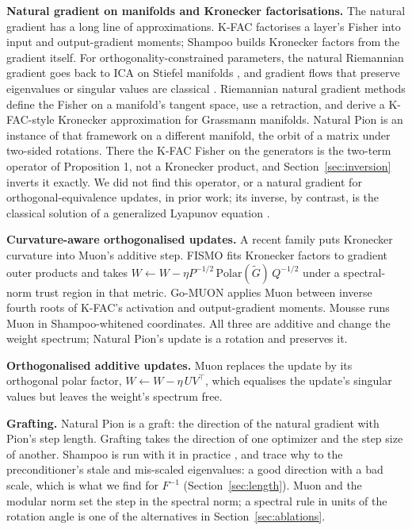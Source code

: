 \documentclass{article}
\begin{document}
\textbf{Natural gradient on manifolds and Kronecker factorisations.} The natural gradient \citep{amari1998natural}
has a long line of approximations. K-FAC \citep{martens2015kfac} factorises a layer's Fisher into input and
output-gradient moments; Shampoo \citep{gupta2018shampoo} builds Kronecker factors from the gradient itself. For
orthogonality-constrained parameters, the natural Riemannian gradient goes back to ICA on Stiefel manifolds
\citep{amari1999ica}, and gradient flows that preserve eigenvalues or singular values are classical
\citep[][Ch.~2--3]{helmke1994optimization}. Riemannian natural gradient methods \citep{hu2024riemannian} define the Fisher
on a manifold's tangent space, use a retraction, and derive a K-FAC-style Kronecker approximation for Grassmann
manifolds. Natural Pion is an instance of that framework on a different manifold, the orbit of a matrix under two-sided
rotations. There the K-FAC Fisher on the generators is the two-term operator of Proposition 1, not a Kronecker product,
and Section~\ref{sec:inversion} inverts it exactly. We did not find this operator, or a natural gradient for
orthogonal-equivalence updates, in prior work; its inverse, by contrast, is the classical solution of a generalized
Lyapunov equation \citep{simoncini2016computational}.

\textbf{Curvature-aware orthogonalised updates.} A recent family puts Kronecker curvature into Muon's
additive step. FISMO \citep{xu2026fismo} fits Kronecker factors to gradient outer products and takes
\(W \leftarrow W - \eta P^{-1/2}\,\mathrm{Polar}(\tilde G)\, Q^{-1/2}\) under a spectral-norm trust region in that
metric. Go-MUON \citep{che2026gomuon} applies Muon between inverse fourth roots of K-FAC's activation and
output-gradient moments. Mousse \citep{zhang2026mousse} runs Muon in Shampoo-whitened coordinates. All three are
additive and change the weight spectrum; Natural Pion's update is a rotation and preserves it.

\textbf{Orthogonalised additive updates.} Muon \citep{jordan2024muon} replaces the update by its orthogonal
polar factor, \(W \leftarrow W - \eta\, UV^\top\), which equalises the update's singular values but
leaves the weight's spectrum free.

\textbf{Grafting.} Natural Pion is a graft: the direction of the natural gradient with Pion's step length. Grafting
\citep{agarwal2020grafting} takes the direction of one optimizer and the step size of another. Shampoo is run with it
in practice \citep{anil2020scalable,shi2023distributed}, and \citet{eschenhagen2025purifying} trace why to the
preconditioner's stale and mis-scaled eigenvalues: a good direction with a bad scale, which is what we find for
\(F^{-1}\) (Section~\ref{sec:length}). Muon and the modular norm \citep{large2024modular,bernstein2024old} set the step in
the spectral norm; a spectral rule in units of the rotation angle is one of the alternatives in
Section~\ref{sec:ablations}.
\end{document}
